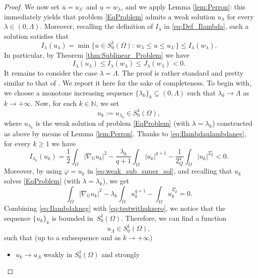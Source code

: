 \documentclass[11pt]{amsart}
\numberwithin{equation}{section} %
\theoremstyle{definition}
\begin{document}
\begin{proof}
We now set $\overline{u}= u_{\lambda'}$ and $\underline{u} = w_{\lambda}$,	
	and we apply Lemma \ref{lem:Perron}: this immediately yields that problem \eqref{EqProblem} admits a weak solution $u_{\lambda}$ for every $\lambda \in (0,\Lambda)$. Moreover, recalling the definition of $I_{\lambda}$ in \eqref{eq:Def_Ilambda}, such a solution satisfies that
	$$I_{\lambda}(u_\lambda) = \min\{u\in S_0^1(\Omega):\,w_{\lambda}\leq u\leq u_{\lambda'}\}
	\leq I_{\lambda}(w_{\lambda}).$$
	In particular,
	by Theorem \ref{thm:Sublinear_Problem} we have
	\begin{equation} \label{eq:Ilambdaulambdaneg}
		I_{\lambda}(u_{\lambda}) \leq I_{\lambda}(w_{\lambda}) \leq J_{\lambda}(w_{\lambda}) <0.
	\end{equation}
	It remains to consider the case $\lambda = \Lambda$. The proof
	is rather standard and pretty similar to that of \cite[Lemma 3.5]{BiGaVe}. We report it here for the sake of completeness.
	To begin with, we choose a monotone increasing sequence $\{\lambda_k\}_k\subseteq(0,\Lambda)$ such that 
     $\lambda_{k} \to \Lambda$ as $k\to+\infty$. Now, for each $k \in \mathbb{N}$, we set
	$$u_k := u_{\lambda_k}\in S^{1}_{0}(\Omega),$$
	\noindent where $u_{\lambda_k}$ is the weak solution of problem \eqref{EqProblem} (with $\lambda = \lambda_k$) constructed
	as above by means of Lemma \ref{lem:Perron}. Thanks to 
	\eqref{eq:Ilambdaulambdaneg}, for every $k\geq 1$ we have
	\begin{equation} \label{eq:Ilambdakneg}
		I_{\lambda_k}(u_{k}) 
		= \dfrac{1}{2} \int_{\Omega}|\nabla_{\mathbb{G}}u_k|^2 - \dfrac{\lambda_k}{q+1}\int_{\Omega}|u_k|^{q+1} - \dfrac{1}{2^{\star}_{Q}}\int_{\Omega}|u_k|^{2^{\star}_{Q}} <0.
	\end{equation}
	Moreover, by using $\varphi = u_k$ in \eqref{eq:weak_sub_super_sol},  and recalling that $u_k$
	solves \eqref{EqProblem} (with $\lambda = \lambda_k$), we get
	\begin{equation} \label{eq:testwithukzero}
		\int_{\Omega}|\nabla_{\mathbb{G}}u_k|^2 -\lambda_k\int_\Omega u_k^{q+1}
		-\int_\Omega u_k^{2^{\star}_{Q}} = 0.
	\end{equation}
	Combining \eqref{eq:Ilambdakneg} with \eqref{eq:testwithukzero},
	we notice that the sequence $\{u_k\}_k$ is  bounded in~$S^{1}_{0}(\Omega)$.
	Therefore, we can find a function
	$$u_{\Lambda}\in S^{1}_{0}(\Omega),$$ 
	such that
	(up to a subsequence and as $k\to+\infty$)
	\begin{itemize}
		\item[a)] $u_k\to u_{\Lambda}$ weakly in $S^{1}_{0}(\Omega)$ and strongly

\end{itemize}
\end{proof}
\end{document}
